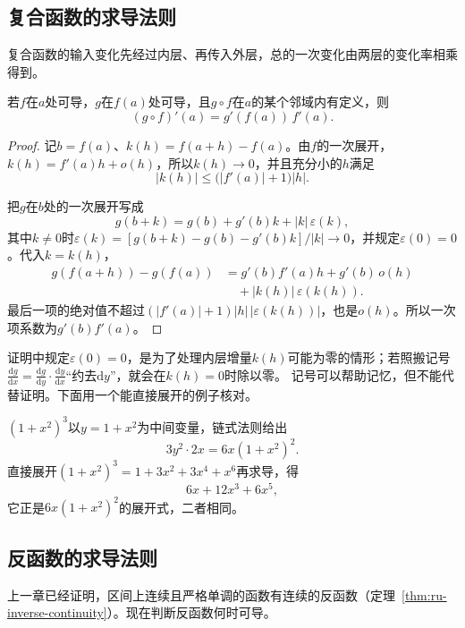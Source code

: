 \subsection{复合函数的求导法则}
\label{sec:ru-chain-rule}

复合函数的输入变化先经过内层、再传入外层，总的一次变化由两层的变化率相乘得到。
\begin{theorem}[链式法则]
\label{thm:ru-chain-rule}
若$f$在$a$处可导，$g$在$f(a)$处可导，且$g\circ f$在$a$的某个邻域内有定义，则
\begin{equation}
 (g\circ f)'(a)=g'(f(a))\,f'(a).
 \label{eq:analysis-scalar-chain-rule}
\end{equation}
\end{theorem}
\begin{proof}
记$b=f(a)$、$k(h)=f(a+h)-f(a)$。由$f$的一次展开，$k(h)=f'(a)h+o(h)$，所以$k(h)\to0$，并且充分小的$h$满足
\[
 |k(h)|\leq\bigl(|f'(a)|+1\bigr)|h|.
\]

把$g$在$b$处的一次展开写成
\[
 g(b+k)=g(b)+g'(b)k+|k|\,\varepsilon(k),
\]
其中$k\neq0$时$\varepsilon(k)=[g(b+k)-g(b)-g'(b)k]/|k|\to0$，并规定$\varepsilon(0)=0$。代入$k=k(h)$，
\[
 \begin{aligned}
 g(f(a+h))-g(f(a))
 &=g'(b)f'(a)h+g'(b)\,o(h)\\
 &\quad+|k(h)|\,\varepsilon(k(h)).
 \end{aligned}
\]
最后一项的绝对值不超过$(|f'(a)|+1)|h|\,|\varepsilon(k(h))|$，也是$o(h)$。所以一次项系数为$g'(b)f'(a)$。
\end{proof}
证明中规定$\varepsilon(0)=0$，是为了处理内层增量$k(h)$可能为零的情形；若照搬记号$\frac{\mathrm dg}{\mathrm dx}=\frac{\mathrm dg}{\mathrm dy}\cdot\frac{\mathrm dy}{\mathrm dx}$“约去$\mathrm dy$”，就会在$k(h)=0$时除以零。
记号可以帮助记忆，但不能代替证明。下面用一个能直接展开的例子核对。
\begin{example}[用展开核对链式法则]
\label{ex:ru-chain-rule-check}
$(1+x^2)^3$以$y=1+x^2$为中间变量，链式法则给出
\[
 3y^2\cdot2x=6x(1+x^2)^2.
\]
直接展开$(1+x^2)^3=1+3x^2+3x^4+x^6$再求导，得
\[
 6x+12x^3+6x^5,
\]
它正是$6x(1+x^2)^2$的展开式，二者相同。
\end{example}

\subsection{反函数的求导法则}
\label{sec:ru-inverse-derivative}

上一章已经证明，区间上连续且严格单调的函数有连续的反函数（定理~\ref{thm:ru-inverse-continuity}）。现在判断反函数何时可导。

